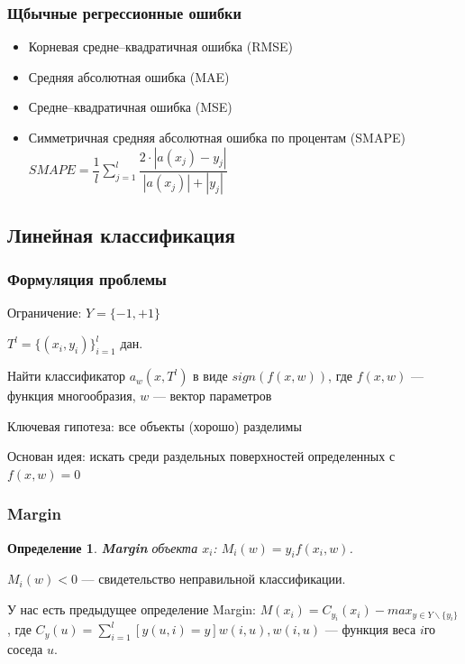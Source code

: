 \documentclass[10pt,a4paper,oneside,titlepage]{report}
\theoremstyle{defenition}
\newtheorem*{defenition}{Определение}
\theoremstyle{theorem}
\begin{document}
\subsubsection{Щбычные регрессионные ошибки}

\begin{itemize}
	\item Корневая средне--квадратичная ошибка (RMSE)
	\item Средняя абсолютная ошибка (MAE)
	\item Средне--квадратичная ошибка (MSE)
	\item Симметричная средняя абсолютная ошибка по процентам (SMAPE) $SMAPE = \dfrac1l \sum_{j=1}^{l}\dfrac{2\cdot |a(x_j) - y_j|}{|a(x_j)| + |y_j|}$
\end{itemize}

\subsection{Линейная классификация}

\subsubsection{Формуляция проблемы}

Ограничение: $Y = \{-1, +1\}$

$T^l = \{(x_i,y_i)\}_{i = 1}^l$ дан.

Найти классификатор $a_w(x, T^l)$ в виде $sign(f(x, w))$, где $f(x, w)$ --- функция многообразия, $w$ --- вектор параметров

Ключевая гипотеза: все объекты (хорошо) разделимы

Основан идея: искать среди раздельных поверхностей определенных с $f(x, w) = 0$

\subsubsection{Margin}

\begin{defenition}
	{\bfseries Margin} объекта $x_i$: $M_i(w) = y_if(x_i, w)$.
\end{defenition}

$M_i(w) < 0$ --- свидетельство неправильной классификации.

У нас есть предыдущее определение Margin: $M(x_i) = C_{y_i}(x_i) - max_{y\in Y\backslash\{y_i\}}$, где $C_y(u) = \sum_{i=1}^l[y(u, i) = y]w(i, u),  w(i,u)$ --- функция веса $i$го соседа $u$.
\end{document}
